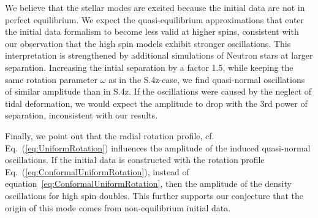\documentclass[aps,prd,amsmath,floatfix
,twocolumn
,superscriptaddress,nofootinbib,showpacs]{revtex4-1}
\theoremstyle{plain} \newtheorem{thm}{Theorem} \newtheorem{lem}{Lemma}
\begin{document}
We believe  that the  stellar  modes are  excited because  the
  initial  data  are  not  in  perfect  equilibrium.   We  expect  the
  quasi-equilibrium  approximations   that  enter  the   initial  data
  formalism to become less valid  at higher spins, consistent with our
  observation that the high spin models exhibit stronger oscillations.
  This  interpretation is  strengthened by  additional simulations  of
  Neutron stars at larger separation. Increasing   the  intial
  separation  by  a  factor  1.5,  while  keeping  the  same  rotation
  parameter  $\omega$  as  in  the  S.4z-case,  we  find  quasi-normal
  oscillations   of  similar   amplitude  than   in  S.4z.    If  the
  oscillations were  caused by  the neglect  of tidal  deformation, we
  would expect the amplitude to drop with the 3rd power of separation,
  inconsistent with our results.


Finally, we point out that the radial rotation profile,
  cf. Eq.~(\ref{eq:UniformRotation}) influences the amplitude of the
  induced quasi-normal oscillations.  If the initial data is
  constructed with the rotation profile
  Eq.~(\ref{eq:ConformalUniformRotation}), instead of
  equation~\ref{eq:ConformalUniformRotation}, then the amplitude of
  the density oscillations for high spin doubles. This further
  supports our conjecture that the origin of this mode comes from
  non-equilibrium initial data.






\end{document}
